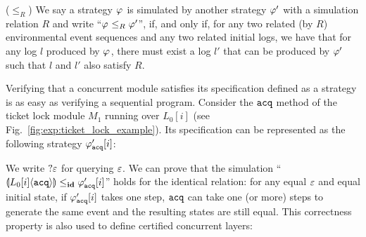 \begin{definition}($\le_R$) We say a strategy $\strat{}$ is simulated by
another strategy $\strat{}'$ with a simulation relation $R$ and write ``$\strat{} \le_R \strat{}'$'', if, and only if, for any two related (by $R$) environmental event sequences and any two related initial logs, we have that
for any log $l$ produced by $\strat{}$, there must exist a log $l'$ that can be produced by $\strat{}'$ such that $l$ and $l'$ also satisfy $R$.
\end{definition}

Verifying that a concurrent module satisfies its specification 
defined as a strategy is as easy as verifying a sequential program.
Consider the $\codeinmath{acq}$ method of the ticket lock module $M_1$ running 
over $L_0[i]$ (see Fig.~\ref{fig:exp:ticket_lock_example}). 
Its  specification
can be represented as the following strategy $\strat{\codeinmath{acq}}'[i]$:
\begin{center}
\end{center}
We write $?\oracle$ for querying $\oracle$.
We can prove that the simulation ``$\ssem{\codeinmath{acq}}{L_0[i]}\le_\id \strat{\codeinmath{acq}}'[i]$'' holds for the identical relation: for any equal $\oracle$
and equal initial state, if $\strat{\codeinmath{acq}}'[i]$ takes one step, $\codeinmath{acq}$ can take one (or more) steps to generate the same event and the resulting states are still equal. This correctness property is also used to define certified concurrent layers:
